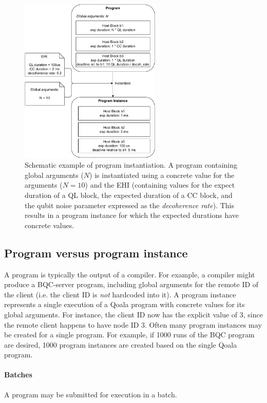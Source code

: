 \begin{figure}[t]
    \centering
    \includegraphics[width=0.6\textwidth]{figures/qoala/instantiation.pdf}
    \caption{Schematic example of program instantiation.
    A program containing global arguments ($N$) is instantiated using a concrete value for the arguments ($N = 10$) and the EHI (containing values for the expect duration of a QL block, the expected duration of a CC block, and the qubit noise parameter expressed as the \textit{decoherence rate}). This results in a program instance for which the expected durations have concrete values.
    }
    \label{qoala:fig:app:instantiation}
\end{figure}

\subsection{Program versus program instance}
A program is typically the output of a compiler.
For example, a compiler might produce a BQC-server program, including global arguments for the remote ID of the client (i.e. the client ID is \textit{not} hardcoded into it).
A program instance represents a single execution of a Qoala program with concrete values for its global arguments.
For instance, the client ID now has the explicit value of 3, since the remote client happens to have node ID 3.
Often many program instances may be created for a single program.
For example, if 1000 runs of the BQC program are desired, 1000 program instances are created based on the single Qoala program.

\paragraph{Batches}
A program may be submitted for execution in a batch.

